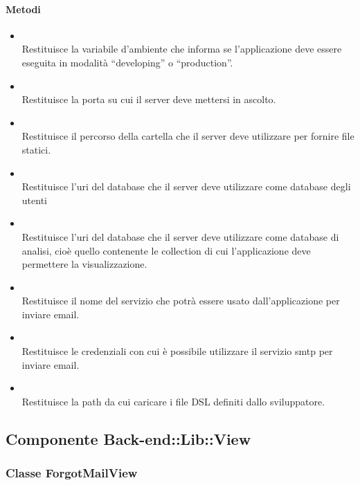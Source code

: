 \paragraph*{Metodi}
\begin{itemize}
\item[]  \\ Restituisce la variabile d'ambiente che informa se l'applicazione deve essere eseguita in modalità ``developing'' o ``production''.
\item[]  \\ Restituisce la porta su cui il server deve mettersi in ascolto.
\item[]  \\ Restituisce il percorso della cartella che il server deve utilizzare per fornire file statici.
\item[]  \\ Restituisce l'uri del database che il server deve utilizzare come database degli utenti
\item[]  \\ Restituisce l'uri del database che il server deve utilizzare come database di analisi, cioè quello contenente le collection di cui l'applicazione deve permettere la visualizzazione.
\item[]  \\ Restituisce il nome del servizio che potrà essere usato dall'applicazione per inviare email.
\item[]  \\ Restituisce le credenziali con cui è possibile utilizzare il servizio smtp per inviare email.
\item[]  \\ Restituisce la path da cui caricare i file DSL definiti dallo sviluppatore.
\end{itemize}

\subsection{Componente Back-end::Lib::View}

\subsubsection{Classe ForgotMailView}


